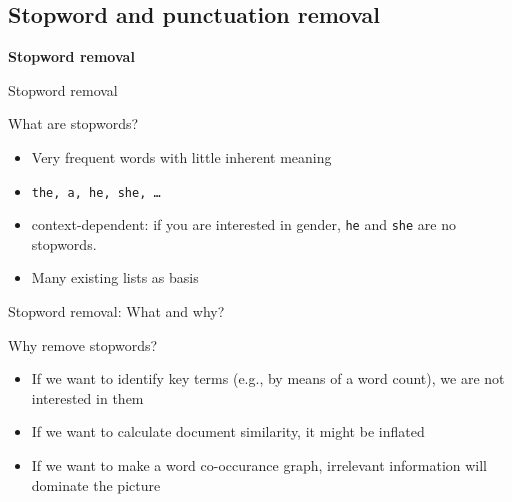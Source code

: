 \documentclass[compress]{beamer}
\begin{document}
\subsection{Stopword and punctuation removal}

\begin{frame}
\textbf{Stopword removal} \\
\vspace{1cm}
\end{frame}

\begin{frame}{Stopword removal}
\begin{block}{What are stopwords?}
\begin{itemize}
\item Very frequent words with little inherent meaning
\item \texttt{the, a, he, she, \ldots}
\item context-dependent: if you are interested in gender, \texttt{he} and \texttt{she} are no stopwords. 
\item Many existing lists as basis
\end{itemize}
\end{block}

\end{frame}

\begin{frame}{Stopword removal: What and why?}
\begin{block}{Why remove stopwords?}
	\begin{itemize}
		\item If we want to identify key terms (e.g., by means of a word count), we are not interested in them
		\item If we want to calculate document similarity, it might be inflated
		\item If we want to make a word co-occurance graph, irrelevant information will dominate the picture
	\end{itemize}
\end{block}
\end{frame}
\end{document}
